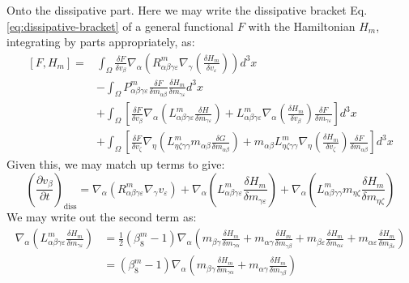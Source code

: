 \documentclass[reqno]{article}
\begin{document}
  Onto the dissipative part.
  Here we may write the dissipative bracket Eq. \eqref{eq:dissipative-bracket} of a general functional $F$ with the
  Hamiltonian $H_m$, integrating by parts appropriately, as:
  \begin{equation}
    \begin{split}
      \left[ F, H_m \right]
      =
      &\int_\Omega \frac{\delta F}{\delta v_\beta}  \nabla_\alpha \left(R^m_{\alpha\beta\gamma\varepsilon} \nabla_\gamma \left( \frac{\delta H_m}{\delta v_\varepsilon} \right) \right) d^3x \\
      &- \int_\Omega P^m_{\alpha\beta\gamma\varepsilon} \frac{\delta F}{\delta m_{\alpha \beta}} \frac{\delta H_m}{\delta m_{\gamma\varepsilon}} d^3x \\
      &+ \int_\Omega \left[
        \frac{\delta F}{\delta v_\beta} \nabla_\alpha \left( L^m_{\alpha\beta\gamma\varepsilon} \frac{\delta H}{\delta m_{\gamma\varepsilon}} \right)
        + L^m_{\alpha\beta\gamma\varepsilon} \nabla_\alpha \left( \frac{\delta H_m}{\delta v_\beta} \right) \frac{\delta F}{\delta m_{\gamma\varepsilon}}
        \right] d^3x \\
        &+ \int_\Omega \left[
          \frac{\delta F}{\delta v_\zeta} \nabla_\eta \left( L^m_{\eta\zeta\gamma\gamma} m_{\alpha\beta} \frac{\delta G}{\delta m_{\alpha\beta}} \right)
          + m_{\alpha\beta} L^m_{\eta\zeta \gamma\gamma}\nabla_\eta \left( \frac{\delta H_m}{\delta v_\zeta} \right) \frac{\delta F}{\delta m_{\alpha\beta}}
        \right] d^3 x
    \end{split}
  \end{equation}
  Given this, we may match up terms to give:
  \begin{equation}
    \left( \frac{\partial v_\beta}{\partial t} \right)_\text{diss}
    =
    \nabla_\alpha \left( R^m_{\alpha\beta\gamma\varepsilon} \nabla_\gamma v_\varepsilon \right)
    + \nabla_\alpha \left( L^m_{\alpha\beta\gamma\varepsilon} \frac{\delta H_m}{\delta m_{\gamma\varepsilon}} \right)
    + \nabla_\alpha \left( L^m_{\alpha \beta \gamma\gamma} m_{\eta\zeta} \frac{\delta H_m}{\delta m_{\eta\zeta}} \right)
  \end{equation}
  We may write out the second term as:
  \begin{equation}
    \begin{split}
    \nabla_\alpha \left( L^m_{\alpha\beta\gamma\varepsilon} \frac{\delta H_m}{\delta m_{\gamma\varepsilon}} \right)
    &= \tfrac12 \left( \beta^m_8 - 1 \right)
    \nabla_\alpha
    \left(
      m_{\beta\gamma} \frac{\delta H_m}{\delta m_{\gamma\alpha}}
      + m_{\alpha\gamma} \frac{\delta H_m}{\delta m_{\gamma \beta}}
      + m_{\beta\varepsilon} \frac{\delta H_m}{\delta m_{\alpha\varepsilon}}
      + m_{\alpha\varepsilon} \frac{\delta H_m}{\delta m_{\beta\varepsilon}}
    \right) \\
    &= \left( \beta^m_8 - 1 \right)
    \nabla_{\alpha}
    \left(
      m_{\beta\gamma} \frac{\delta H_m}{\delta m_{\gamma\alpha}}
      + m_{\alpha\gamma} \frac{\delta H_m}{\delta m_{\gamma \beta}}
    \right)
    \end{split}
  \end{equation}
\end{document}
